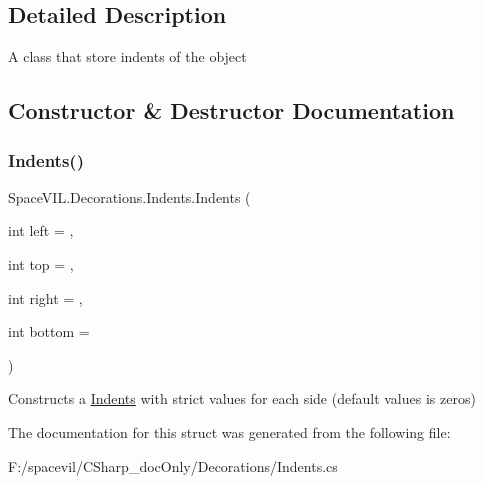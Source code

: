 \subsection{Detailed Description}
A class that store indents of the object 



\subsection{Constructor \& Destructor Documentation}
\mbox{\label{struct_space_v_i_l_1_1_decorations_1_1_indents_ab4ff2d499016f5ac819720f150cb09f1}} 
\subsubsection{\texorpdfstring{Indents()}{Indents()}}
{\footnotesize\ttfamily Space\+V\+I\+L.\+Decorations.\+Indents.\+Indents (\begin{DoxyParamCaption}\item[{int}]{left = {},  }\item[{int}]{top = {},  }\item[{int}]{right = {},  }\item[{int}]{bottom = {} }\end{DoxyParamCaption})}



Constructs a \mbox{\hyperlink{struct_space_v_i_l_1_1_decorations_1_1_indents}{Indents}} with strict values for each side (default values is zeros) 



The documentation for this struct was generated from the following file\+:\begin{DoxyCompactItemize}
\item 
F\+:/spacevil/\+C\+Sharp\+\_\+doc\+Only/\+Decorations/Indents.\+cs\end{DoxyCompactItemize}
